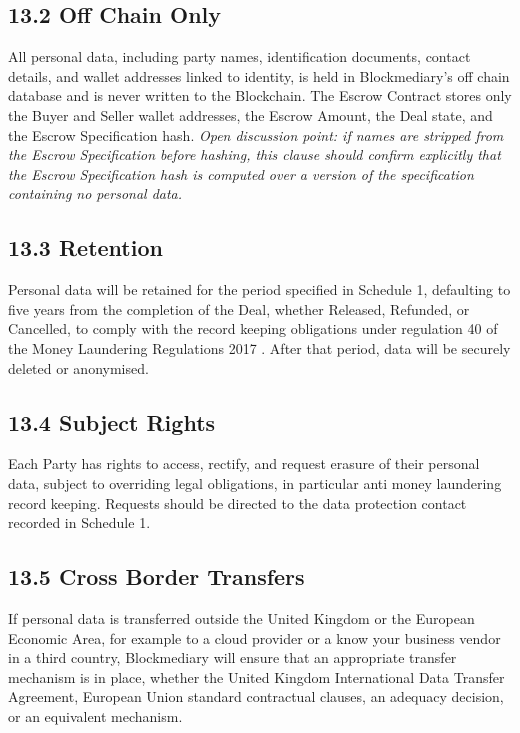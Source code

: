 \documentclass[12pt, a4paper]{article}
\begin{document}
\subsection*{13.2 Off Chain Only}

All personal data, including party names, identification documents, contact details, and
wallet addresses linked to identity, is held in Blockmediary's off chain database and is
never written to the Blockchain. The Escrow Contract stores only the Buyer and Seller
wallet addresses, the Escrow Amount, the Deal state, and the Escrow Specification hash.
\textit{Open discussion point: if names are stripped from the Escrow Specification before
hashing, this clause should confirm explicitly that the Escrow Specification hash is
computed over a version of the specification containing no personal data.}

\subsection*{13.3 Retention}

Personal data will be retained for the period specified in Schedule 1, defaulting to five
years from the completion of the Deal, whether Released, Refunded, or Cancelled, to comply
with the record keeping obligations under regulation 40 of the Money Laundering
Regulations 2017 \citep{mlr2017}. After that period, data will be securely deleted or
anonymised.

\subsection*{13.4 Subject Rights}

Each Party has rights to access, rectify, and request erasure of their personal data,
subject to overriding legal obligations, in particular anti money laundering record
keeping. Requests should be directed to the data protection contact recorded in Schedule
1.

\subsection*{13.5 Cross Border Transfers}

If personal data is transferred outside the United Kingdom or the European Economic Area,
for example to a cloud provider or a know your business vendor in a third country,
Blockmediary will ensure that an appropriate transfer mechanism is in place, whether the
United Kingdom International Data Transfer Agreement, European Union standard contractual
clauses, an adequacy decision, or an equivalent mechanism.
\end{document}
